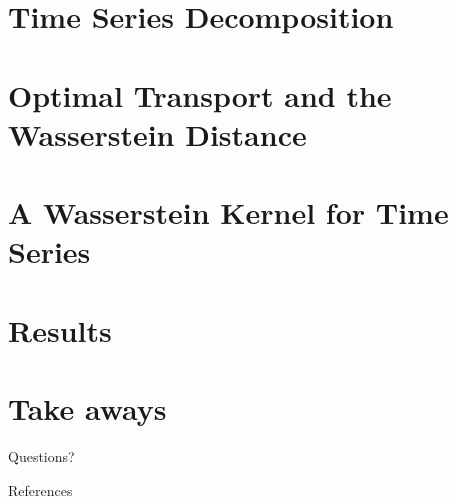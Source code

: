 \documentclass[10pt]{beamer}
\begin{document}
\section{Time Series Decomposition}
\section{Optimal Transport and the Wasserstein Distance}

\section{A Wasserstein Kernel for Time Series}


\section{Results}


\section{Take aways}



\begin{frame}[standout]
  Questions?
\end{frame}

\begin{frame}[allowframebreaks]{References}

  
  

\end{frame}

\appendix
\end{document}
